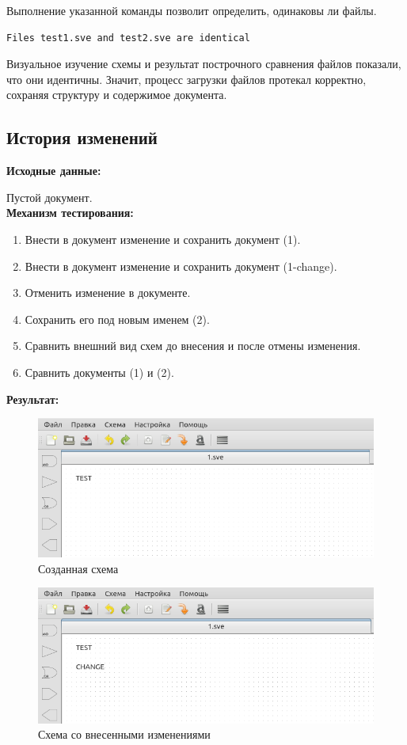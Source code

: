 Выполнение указанной команды позволит определить, одинаковы ли файлы.
\begin{lstlisting}
Files test1.sve and test2.sve are identical
\end{lstlisting}

Визуальное изучение схемы и результат построчного сравнения файлов показали, что они идентичны.
Значит, процесс загрузки файлов протекал корректно, сохраняя структуру и содержимое документа.

\subsection{История изменений}
\textbf{Исходные данные:}

Пустой документ.\\

\textbf{Механизм тестирования:}
\begin{enumerate}
  \item Внести в документ изменение и сохранить документ (1).
  \item Внести в документ изменение и сохранить документ (1-change).
  \item Отменить изменение в документе.
  \item Сохранить его под новым именем (2).
  \item Сравнить внешний вид схем до внесения и после отмены изменения.
  \item Сравнить документы (1) и (2).
\end{enumerate}

\textbf{Результат:}
\begin{figure}[H]
  \centering
  \includegraphics[width=1\textwidth]{gui/test/history-1.png}
  \caption{Созданная схема}
  \label{fig:test-hist-1}
\end{figure}

\begin{figure}[H]
  \centering
  \includegraphics[width=1\textwidth]{gui/test/history-1-change.png}
  \caption{Схема со внесенными изменениями}
  \label{fig:test-hist-1-change}
\end{figure}

